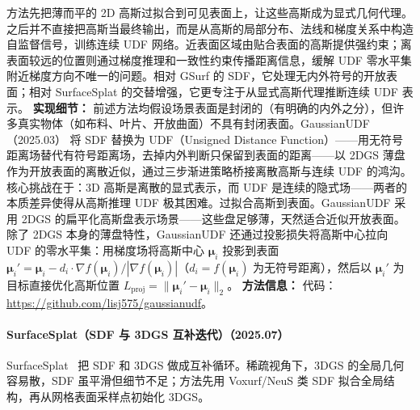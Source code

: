 方法先把薄而平的 2D 高斯过拟合到可见表面上，让这些高斯成为显式几何代理。之后并不直接把高斯当最终输出，而是从高斯的局部分布、法线和梯度关系中构造自监督信号，训练连续 UDF 网络。近表面区域由贴合表面的高斯提供强约束；离表面较远的位置则通过梯度推理和一致性约束传播距离信息，缓解 UDF 零水平集附近梯度方向不唯一的问题。相对 GSurf 的 SDF，它处理无内外符号的开放表面；相对 SurfaceSplat 的交替增强，它更专注于从显式高斯代理推断连续 UDF 表示。
\textbf{实现细节：} 前述方法均假设场景表面是封闭的（有明确的内外之分），但许多真实物体（如布料、叶片、开放曲面）不具有封闭表面。GaussianUDF（2025.03） 将 SDF 替换为 UDF（Unsigned Distance Function）——用无符号距离场替代有符号距离场，去掉内外判断只保留到表面的距离——以 2DGS 薄盘作为开放表面的离散近似，通过三步渐进策略桥接离散高斯与连续 UDF 的鸿沟。核心挑战在于：3D 高斯是离散的显式表示，而 UDF 是连续的隐式场——两者的本质差异使得从高斯推理 UDF 极其困难。过拟合高斯到表面。GaussianUDF 采用 2DGS 的扁平化高斯盘表示场景——这些盘足够薄，天然适合近似开放表面。除了 2DGS 本身的薄盘特性，GaussianUDF 还通过投影损失将高斯中心拉向 UDF 的零水平集：用梯度场将高斯中心 $\boldsymbol{\mu}_i$ 投影到表面 $\boldsymbol{\mu}_i' = \boldsymbol{\mu}_i - d_i \cdot \nabla f(\boldsymbol{\mu}_i) / |\nabla f(\boldsymbol{\mu}_i)|$（$d_i = f(\boldsymbol{\mu}_i)$ 为无符号距离），然后以 $\boldsymbol{\mu}_i'$ 为目标直接优化高斯位置 $L_{\mathrm{proj}} = \|\boldsymbol{\mu}_i' - \boldsymbol{\mu}_i\|_2$。
\textbf{方法信息：} 代码：\url{https://github.com/lisj575/gaussianudf}。
\paragraph{SurfaceSplat（SDF 与 3DGS 互补迭代）（2025.07）}
SurfaceSplat~\cite{2507_15602} 把 SDF 和 3DGS 做成互补循环。稀疏视角下，3DGS 的全局几何容易散，SDF 虽平滑但细节不足；方法先用 Voxurf/NeuS 类 SDF 拟合全局结构，再从网格表面采样点初始化 3DGS。

